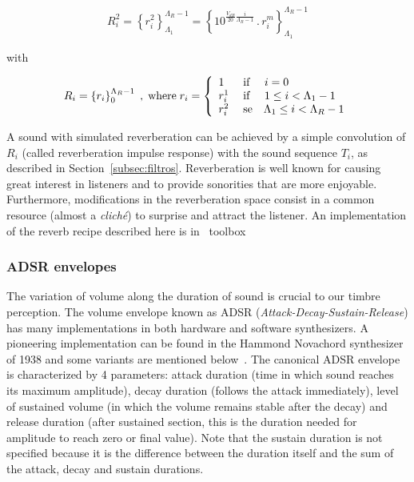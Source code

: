 \begin{equation}\label{eq:p2rev}
    R_i^2=\left\{r_i^2\right\}_{\Lambda_1}^{\Lambda_R-1}=\left\{10^{\frac{V_{dB}}{20}\frac{i}{\Lambda_R-1}}\,.\,r_i^m\right\}_{\Lambda_1}^{\Lambda_R-1}
\end{equation}

\noindent with

\begin{equation}\label{eq:rev}
	R_i=\left\{r_i\right\}_0^{\Lambda_R-1}\;,\; \text{where} \; r_i=\left\{
        \begin{array}{l l}
            1\; & \text{if }\quad i=0 \\
            r_i^1\;  & \text{if }\quad 1\leq i<\Lambda_1-1 \\
                                     r_i^2 \; & \text{se}\quad \Lambda_1 \leq i < \Lambda_R-1 \\
        \end{array} \right.
\end{equation}

A sound with simulated reverberation can be achieved by a simple convolution of $R_i$ (called reverberation impulse response) with the sound sequence $T_i$, as described in Section~\ref{subsec:filtros}. Reverberation is well known for causing great interest in listeners and to provide sonorities that are more enjoyable. Furthermore, modifications in the reverberation space consist in a common resource (almost a \textit{clich\'{e}}) to surprise and attract the listener. An implementation of the reverb recipe described here is in \massa\ toolbox~\cite{MASSA}

\subsubsection{ADSR envelopes}
The variation of volume along the duration of sound is crucial to our timbre perception. The volume envelope known as ADSR (\emph{Attack-Decay-Sustain-Release}) has many implementations in both hardware and software synthesizers. A pioneering implementation can be found in the Hammond Novachord synthesizer of 1938 and some variants are mentioned below~\cite{ADSR}. The canonical ADSR envelope is characterized by 4 parameters: attack duration (time in which sound reaches its maximum amplitude), decay duration (follows the attack immediately), level of sustained volume (in which the volume remains stable after the decay) and release duration (after sustained section, this is the duration needed for amplitude to reach zero or final value).
Note that the sustain duration is not specified because it is the difference between the duration itself and the sum of the attack, decay and sustain durations.

